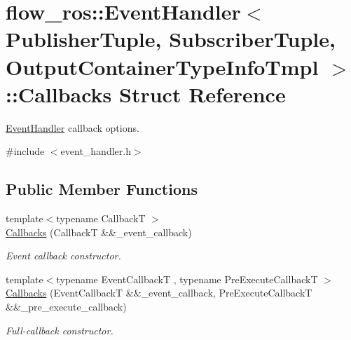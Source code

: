 \hypertarget{structflow__ros_1_1_event_handler_1_1_callbacks}{}\section{flow\+\_\+ros\+:\+:Event\+Handler$<$ Publisher\+Tuple, Subscriber\+Tuple, Output\+Container\+Type\+Info\+Tmpl $>$\+:\+:Callbacks Struct Reference}
\label{structflow__ros_1_1_event_handler_1_1_callbacks}


\hyperlink{classflow__ros_1_1_event_handler}{Event\+Handler} callback options.  




{\ttfamily \#include $<$event\+\_\+handler.\+h$>$}

\subsection*{Public Member Functions}
\begin{DoxyCompactItemize}
\item 
{\footnotesize template$<$typename CallbackT $>$ }\\\hyperlink{structflow__ros_1_1_event_handler_1_1_callbacks_ad939803306c7eba1e8ea6731f53f301c}{Callbacks} (CallbackT \&\&\+\_\+event\+\_\+callback)
\begin{DoxyCompactList}\small\item\em Event callback constructor. \end{DoxyCompactList}\item 
{\footnotesize template$<$typename Event\+CallbackT , typename Pre\+Execute\+CallbackT $>$ }\\\hyperlink{structflow__ros_1_1_event_handler_1_1_callbacks_ae6a43604c27afa05e48153df03d96d2a}{Callbacks} (Event\+CallbackT \&\&\+\_\+event\+\_\+callback, Pre\+Execute\+CallbackT \&\&\+\_\+pre\+\_\+execute\+\_\+callback)
\begin{DoxyCompactList}\small\item\em Full-\/callback constructor. \end{DoxyCompactList}\end{DoxyCompactItemize}
